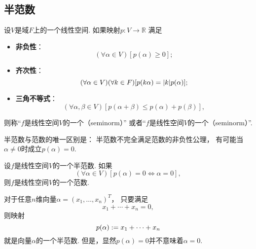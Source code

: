 \subsection{半范数}
\begin{definition}
设\(V\)是域\(F\)上的一个线性空间.
如果映射\(p\colon V \to \mathbb{R}\)
满足\begin{itemize}
	\item {\rm\bf 非负性}：\begin{equation*}
		(\forall \alpha \in V)
		[p(\alpha) \geq 0];
	\end{equation*}

	\item {\rm\bf 齐次性}：\begin{equation*}
		(\forall \alpha \in V)
		(\forall k \in F)
		[
			p(k \alpha) = \abs{k} p(\alpha)
		];
	\end{equation*}

	\item {\rm\bf 三角不等式}：\begin{equation*}
		(\forall \alpha,\beta \in V)
		[
			p(\alpha+\beta) \leq p(\alpha) + p(\beta)
		],
	\end{equation*}
\end{itemize}
则称“\(f\)是线性空间\(V\)的一个（seminorm）”
或者“\(f\)是线性空间\(V\)的一个（seminorm）”.
\end{definition}

半范数与范数的唯一区别是：
半范数不完全满足范数的非负性公理，
有可能当\(\alpha\neq0\)时成立\(p(\alpha) = 0\).
\begin{proposition}
设\(f\)是线性空间\(V\)的一个半范数.
如果\begin{equation*}
	(\forall \alpha \in V)
	[
		p(\alpha) = 0
		\iff
		\alpha = 0
	],
\end{equation*}
则\(f\)是线性空间\(V\)的一个范数.
\end{proposition}

\begin{example}
对于任意\(n\)维向量\(\alpha = (x_1,\dotsc,x_n)^T\)，
只要满足\begin{equation*}
	x_1 + \dotsb + x_n = 0,
\end{equation*}
则映射\begin{equation*}
	p(\alpha)
	:=
	x_1 + \dotsb + x_n
\end{equation*}
就是向量\(\alpha\)的一个半范数.
但是，显然\(p(\alpha) = 0\)并不意味着\(\alpha = 0\).
\end{example}

